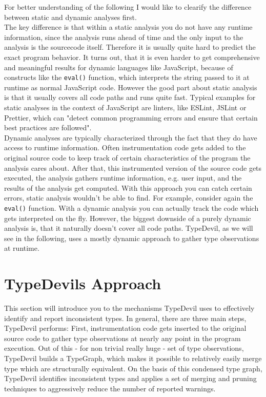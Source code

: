 \documentclass[runningheads,a4paper]{llncs}
\begin{document}
For better understanding of the following I would like to clearify the difference between static and dynamic analyses first.\\
The key difference is that within a static analysis you do not have any runtime information, since the analysis runs ahead of time and the only input to the analysis is the sourcecode itself.
Therefore it is usually quite hard to predict the exact program behavior.
It turns out, that it is even harder to get comprehensive and meaningful results for dynamic languages like JavaScript, because of constructs like the \lstinline[columns=fixed]{eval()} function, which interprets the string passed to it at runtime as normal JavaScript code. 
However the good part about static analysis is that it usually covers all code paths and runs quite fast.
Typical examples for static analyses in the context of JavaScript are linters, like ESLint, JSLint or Prettier, which can "detect common programming errors and ensure that certain best practices are followed". \\
Dynamic analyses are typically characterized through the fact that they do have access to runtime information.
Often instrumentation code gets added to the original source code to keep track of certain characteristics of the program the analysis cares about.
After that, this instrumented version of the source code gets executed, the analysis gathers runtime information, e.g. user input, and the results of the analysis get computed.
With this approach you can catch certain errors, static analysis wouldn't be able to find.
For example, consider again the \lstinline[columns=fixed]{eval()} function.
With a dynamic analysis you can actually track the code which gets interpreted on the fly.
However, the biggest downside of a purely dynamic analysis is, that it naturally doesn't cover all code paths.
TypeDevil, as we will see in the following, uses a mostly dynamic approach to gather type observations at runtime.

\section{TypeDevils Approach}

This section will introduce you to the mechanisms TypeDevil uses to effectively identify and report inconsistent types.
In general, there are three main steps, TypeDevil performs: 
First, instrumentation code gets inserted to the original source code to gather type observations at nearly any point in the program execution.
Out of this - for non trivial really huge - set of type observations, TypeDevil builds a TypeGraph, which makes it possible to relatively easily merge type which are structurally equivalent.
On the basis of this condensed type graph, TypeDevil identifies inconsistent types and applies a set of merging and pruning techniques to aggressively reduce the number of reported warnings.
\end{document}

